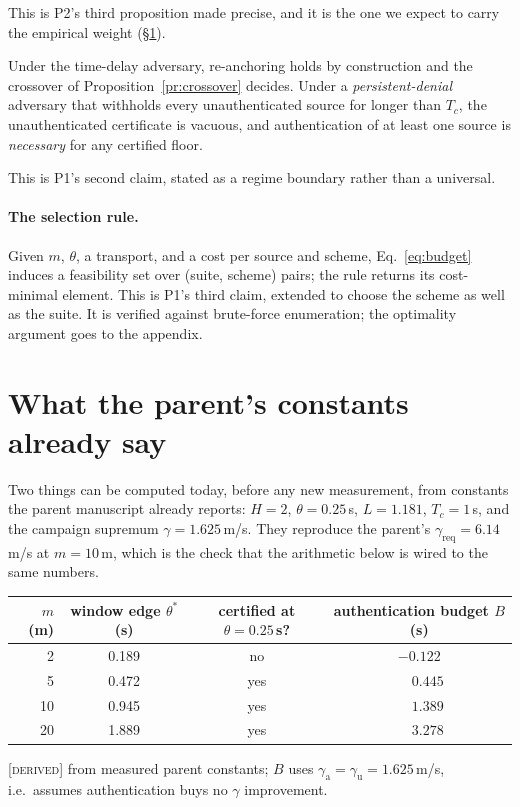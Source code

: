 \documentclass[11pt,a4paper]{article}
\newcommand{\gu}{\gamma_{\mathrm{u}}}
\newcommand{\ga}{\gamma_{\mathrm{a}}}
\newcommand{\prov}[1]{\textsc{\small[#1]}}
\begin{document}
\smallskip
\noindent
This is P2's third proposition made precise, and it is the one we expect to
carry the empirical weight (\S\ref{sec:already}).

\begin{proposition}
\label{pr:regimes}
Under the time-delay adversary, re-anchoring holds by construction and the
crossover of Proposition~\ref{pr:crossover} decides. Under a
\emph{persistent-denial} adversary that withholds every unauthenticated source
for longer than $T_c$, the unauthenticated certificate is vacuous, and
authentication of at least one source is \emph{necessary} for any certified
floor.
\end{proposition}

\smallskip
\noindent
This is P1's second claim, stated as a regime boundary rather than a universal.

\paragraph{The selection rule.} Given $m$, $\theta$, a transport, and a cost per
source and scheme, Eq.~\eqref{eq:budget} induces a feasibility set over
(suite, scheme) pairs; the rule returns its cost-minimal element. This is P1's
third claim, extended to choose the scheme as well as the suite. It is verified
against brute-force enumeration; the optimality argument goes to the appendix.

\section{What the parent's constants already say}
\label{sec:already}
Two things can be computed today, before any new measurement, from constants
the parent manuscript already reports: $H=2$, $\theta=0.25$\,s, $L=1.181$,
$T_c=1$\,s, and the campaign supremum $\gamma=1.625$\,m/s. They reproduce the
parent's $\gamma_{\mathrm{req}}=6.14$\,m/s at $m=10$\,m, which is the check that
the arithmetic below is wired to the same numbers.

\begin{center}\small
\begin{tabular}{@{}rccc@{}}
\toprule
$m$ (m) & window edge $\theta^{*}$ (s) & certified at $\theta=0.25$\,s? &
authentication budget $B$ (s) \\
\midrule
2  & 0.189 & no  & $-0.122$ \\
5  & 0.472 & yes & $\phantom{-}0.445$ \\
10 & 0.945 & yes & $\phantom{-}1.389$ \\
20 & 1.889 & yes & $\phantom{-}3.278$ \\
\bottomrule
\end{tabular}

\smallskip
\prov{derived} from measured parent constants; $B$ uses $\ga=\gu=1.625$\,m/s,
i.e.\ assumes authentication buys no $\gamma$ improvement.
\end{center}
\end{document}
